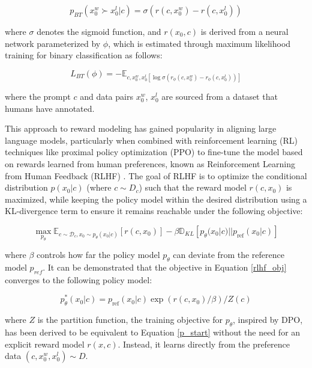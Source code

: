 \begin{equation}
    p_{BT}(x^{w}_0 \succ x^{l}_0|c) = \sigma(r(c,x^{w}_0)-r(c,x^{l}_0))
\end{equation}

where \( \sigma \) denotes the sigmoid function, and \( r(x_0, c) \) is derived from a neural network parameterized by \( \phi \), which is estimated through maximum likelihood training for binary classification as follows:

\begin{equation}
    L_{BT}(\phi) = -\mathit{\mathbb{E}}_{c,x^{w}_0,x^{l}_0[\log \sigma (r_\phi(c,x^{w}_0)-r_\phi(c,x^{l}_0))]}
\end{equation}


where the prompt \( c \) and data pairs \( x_0^w \), \( x_0^l \) are sourced from a dataset that humans have annotated.

This approach to reward modeling has gained popularity in aligning large language models, particularly when combined with reinforcement learning (RL) techniques like proximal policy optimization (PPO) \citep{schulman2017proximal} to fine-tune the model based on rewards learned from human preferences, known as Reinforcement Learning from Human Feedback (RLHF) \citep{ouyang2022training}. The goal of RLHF is to optimize the conditional distribution \( p(x_0|c) \) (where \( c \sim D_c \)) such that the reward model \( r(c, x_0) \) is maximized, while keeping the policy model within the desired distribution using a KL-divergence term to ensure it remains reachable under the following objective:

\begin{equation}
    \max\limits_{p_{\theta}} \mathit{\mathbb{E}}_{c \sim \mathcal{D}_c,x_0\sim p_\theta (x_0|c)}[r(c,x_0)]-\beta\mathit{\mathbb{D}}_{KL}[p_\theta (x_0 | c) || p_{\text{ref}} (x_0|c)]
    \label{rlhf_obj}
\end{equation}

where \( \beta \) controls how far the policy model \(p_\theta\) can deviate from the reference model \(p_{ref}\). It can be demonstrated that the objective in Equation \ref{rlhf_obj} converges to the following policy model:

\begin{equation}
    p^{*}_\theta (x_0|c) = p_{\text{ref}}(x_0|c)\exp (r(c,x_0)/\beta)/Z(c)
    \label{p_start}
\end{equation}

where \( Z \) is the partition function, the training objective for \( p_{\theta} \), inspired by DPO, has been derived to be equivalent to Equation \ref{p_start} without the need for an explicit reward model \( r(x, c) \). Instead, it learns directly from the preference data \( (c, x^w_0, x^l_0) \sim D \).

